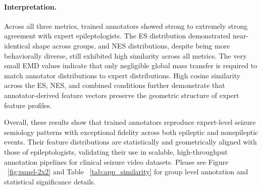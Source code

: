 \documentclass{article}
\theoremstyle{plain}
\theoremstyle{definition}
\theoremstyle{remark}
\begin{document}
\vspace{0.5em}
\paragraph{Interpretation.}
Across all three metrics, trained annotators showed strong to extremely strong agreement with expert epileptologists. The ES distribution demonstrated near-identical shape across groups, and NES distributions, despite being more behaviorally diverse, still exhibited high similarity across all metrics. The very small EMD values indicate that only negligible global mass transfer is required to match annotator distributions to expert distributions. High cosine similarity across the ES, NES, and combined conditions further demonstrate that annotator-derived feature vectors preserve the geometric structure of expert feature profiles.

\vspace{0.5em}
\noindent
Overall, these results show that trained annotators reproduce expert-level seizure semiology patterns with exceptional fidelity across both epileptic and nonepileptic events. Their feature distributions are statistically and geometrically aligned with those of epileptologists, validating their use in scalable, high-throughput annotation pipelines for clinical seizure video datasets. Please see Figure ~\ref{fig:panel-2x2} and Table ~\ref{tab:app_similarity} for group level annotation and statistical significance details.


\end{document}
